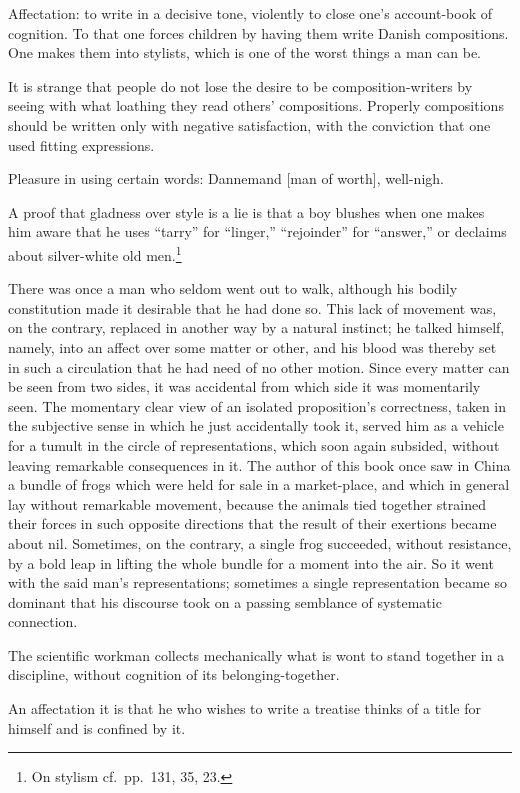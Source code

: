 \documentclass[12pt]{article}
\newcommand{\opage}[1]{\marginnote{\footnotesize\textit{[#1]}}}
\begin{document}
Affectation: to write in a decisive tone, violently to close one's account-book of cognition. To that one forces children by having them write Danish compositions. One makes them into stylists, which is one of the worst things a man can be.

It is strange that people do not lose the desire to be composition-writers by seeing with what loathing they read others' compositions. Properly compositions should be written only with negative satisfaction, with the conviction that one used fitting expressions.

Pleasure in using certain words: Dannemand [man of worth], well-nigh.

A proof that gladness over style is a lie is that a boy blushes when one makes him aware that he uses ``tarry'' for ``linger,'' ``rejoinder'' for ``answer,'' or declaims about silver-white old men.\footnote{On stylism cf.\ pp.\ 131, 35, 23.}

\opage{187}There was once a man who seldom went out to walk, although his bodily constitution made it desirable that he had done so. This lack of movement was, on the contrary, replaced in another way by a natural instinct; he talked himself, namely, into an affect over some matter or other, and his blood was thereby set in such a circulation that he had need of no other motion. Since every matter can be seen from two sides, it was accidental from which side it was momentarily seen. The momentary clear view of an isolated proposition's correctness, taken in the subjective sense in which he just accidentally took it, served him as a vehicle for a tumult in the circle of representations, which soon again subsided, without leaving remarkable consequences in it. The author of this book once saw in China a bundle of frogs which were held for sale in a market-place, and which in general lay without remarkable movement, because the animals tied together strained their forces in such opposite directions that the result of their exertions became about nil. Sometimes, on the contrary, a single frog succeeded, without resistance, by a bold leap in lifting the whole bundle for a moment into the air. So it went with the said man's representations; sometimes a single representation became so dominant that his discourse took on a passing semblance of systematic connection.

The scientific workman collects mechanically what is wont to stand together in a discipline, without cognition of its belonging-together.

An affectation it is that he who wishes to write a treatise thinks of a title for himself and is confined by it.
\end{document}
